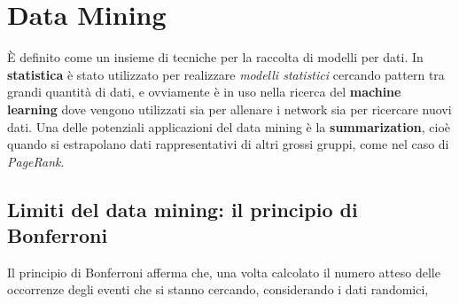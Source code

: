 \documentclass[\main/main.tex]{subfiles}
\begin{document}
\section{Data Mining}
È definito come un insieme di tecniche per la raccolta di modelli per dati. In \textbf{statistica} è stato utilizzato per realizzare \textit{modelli statistici} cercando pattern tra grandi quantità di dati, e ovviamente è in uso nella ricerca del \textbf{machine learning} dove vengono utilizzati sia per allenare i network sia per ricercare nuovi dati. 
Una delle potenziali applicazioni del data mining è la \textbf{summarization}, cioè quando si estrapolano dati rappresentativi di altri grossi gruppi, come nel caso di \textit{PageRank}.

\subsection{Limiti del data mining: il principio di  Bonferroni}
Il principio di Bonferroni afferma che, una volta calcolato il numero atteso delle occorrenze degli eventi che si stanno cercando, considerando i dati randomici, 
 
\end{document}
